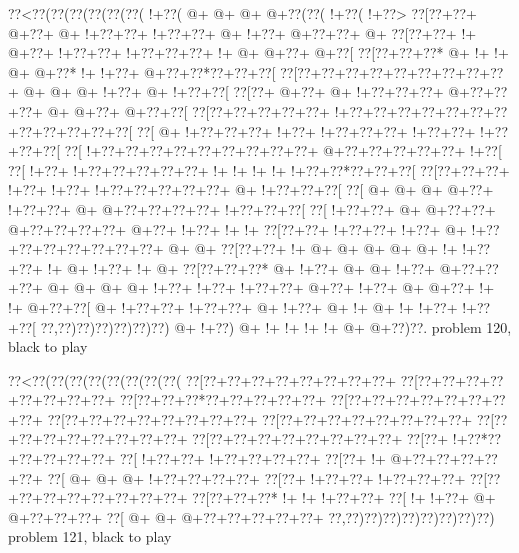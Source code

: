 \vbox{\vbox{\goo
\0??<\0??(\0??(\0??(\0??(\0??(\0??(\- !+\0??(\- @+\- @+\- @+\- @+\0??(\0??(\- !+\0??(\- !+\0??>
\0??[\0??+\0??+\- @+\0??+\- @+\- !+\0??+\0??+\- !+\0??+\0??+\- @+\- !+\0??+\- @+\0??+\0??+\- @+
\0??[\0??+\0??+\- !+\- @+\0??+\- !+\0??+\0??+\- !+\0??+\0??+\0??+\- !+\- @+\- @+\0??+\- @+\0??[
\0??[\0??+\0??+\0??*\- @+\- !+\- !+\- @+\- @+\0??*\- !+\- !+\0??+\- @+\0??+\0??*\0??+\0??+\0??[
\0??[\0??+\0??+\0??+\0??+\0??+\0??+\0??+\0??+\0??+\- @+\- @+\- @+\- !+\0??+\- @+\- !+\0??+\0??[
\0??[\0??+\- @+\0??+\- @+\- !+\0??+\0??+\0??+\- @+\0??+\0??+\0??+\- @+\- @+\0??+\- @+\0??+\0??[
\0??[\0??+\0??+\0??+\0??+\0??+\- !+\0??+\0??+\0??+\0??+\0??+\0??+\0??+\0??+\0??+\0??+\0??+\0??[
\0??[\- @+\- !+\0??+\0??+\0??+\- !+\0??+\- !+\0??+\0??+\0??+\- !+\0??+\0??+\- !+\0??+\0??+\0??[
\0??[\- !+\0??+\0??+\0??+\0??+\0??+\0??+\0??+\0??+\0??+\- @+\0??+\0??+\0??+\0??+\0??+\- !+\0??[
\0??[\- !+\0??+\- !+\0??+\0??+\0??+\0??+\0??+\- !+\- !+\- !+\- !+\- !+\0??+\0??*\0??+\0??+\0??[
\0??[\0??+\0??+\0??+\- !+\0??+\- !+\0??+\- !+\0??+\0??+\0??+\0??+\0??+\- @+\- !+\0??+\0??+\0??[
\0??[\- @+\- @+\- @+\- @+\0??+\- !+\0??+\0??+\- @+\- @+\0??+\0??+\0??+\0??+\- !+\0??+\0??+\0??[
\0??[\- !+\0??+\0??+\- @+\- @+\0??+\0??+\- @+\0??+\0??+\0??+\0??+\- @+\0??+\- !+\0??+\- !+\- !+
\0??[\0??+\0??+\- !+\0??+\0??+\- !+\0??+\- @+\- !+\0??+\0??+\0??+\0??+\0??+\0??+\0??+\- @+\- @+
\0??[\0??+\0??+\- !+\- @+\- @+\- @+\- @+\- @+\- !+\- !+\0??+\0??+\- !+\- @+\- !+\0??+\- !+\- @+
\0??[\0??+\0??+\0??*\- @+\- !+\0??+\- @+\- @+\- !+\0??+\- @+\0??+\0??+\0??+\- @+\- @+\- @+\- @+
\- !+\0??+\- !+\0??+\- !+\0??+\0??+\- @+\0??+\- !+\0??+\- @+\- @+\0??+\- !+\- !+\- @+\0??+\0??[
\- @+\- !+\0??+\0??+\- !+\0??+\0??+\- @+\- !+\0??+\- @+\- !+\- @+\- !+\- !+\0??+\- !+\0??+\0??[
\0??,\0??)\0??)\0??)\0??)\0??)\0??)\- @+\- !+\0??)\- @+\- !+\- !+\- !+\- !+\- @+\- @+\0??)\0??.
}
\hfil problem 120, black to play\hfil\break
}

\vbox{\vbox{\goo
\0??<\0??(\0??(\0??(\0??(\0??(\0??(\0??(\0??(
\0??[\0??+\0??+\0??+\0??+\0??+\0??+\0??+\0??+
\0??[\0??+\0??+\0??+\0??+\0??+\0??+\0??+\0??+
\0??[\0??+\0??+\0??*\0??+\0??+\0??+\0??+\0??+
\0??[\0??+\0??+\0??+\0??+\0??+\0??+\0??+\0??+
\0??[\0??+\0??+\0??+\0??+\0??+\0??+\0??+\0??+
\0??[\0??+\0??+\0??+\0??+\0??+\0??+\0??+\0??+
\0??[\0??+\0??+\0??+\0??+\0??+\0??+\0??+\0??+
\0??[\0??+\0??+\0??+\0??+\0??+\0??+\0??+\0??+
\0??[\0??+\- !+\0??*\0??+\0??+\0??+\0??+\0??+
\0??[\- !+\0??+\0??+\- !+\0??+\0??+\0??+\0??+
\0??[\0??+\- !+\- @+\0??+\0??+\0??+\0??+\0??+
\0??[\- @+\- @+\- @+\- !+\0??+\0??+\0??+\0??+
\0??[\0??+\- !+\0??+\0??+\- !+\0??+\0??+\0??+
\0??[\0??+\0??+\0??+\0??+\0??+\0??+\0??+\0??+
\0??[\0??+\0??+\0??*\- !+\- !+\- !+\0??+\0??+
\0??[\- !+\- !+\0??+\- @+\- @+\0??+\0??+\0??+
\0??[\- @+\- @+\- @+\0??+\0??+\0??+\0??+\0??+
\0??,\0??)\0??)\0??)\0??)\0??)\0??)\0??)\0??)
}
\hfil problem 121, black to play\hfil\break
}

